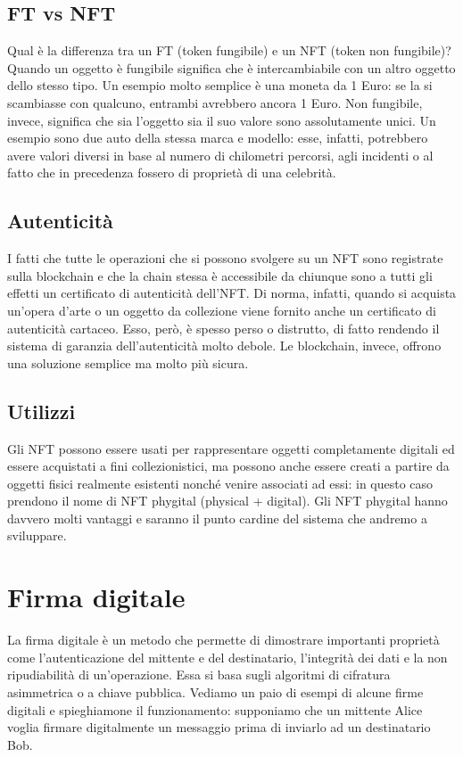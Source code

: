 \documentclass[12pt]{report}
\begin{document}
\subsection{FT vs NFT}
Qual è la differenza tra un FT (token fungibile) e un NFT (token non fungibile)?\newline
Quando un oggetto è fungibile significa che è intercambiabile con un altro oggetto dello stesso tipo. Un esempio molto semplice è una moneta da 1 Euro: se la si scambiasse con qualcuno, entrambi avrebbero ancora 1 Euro.\newline
Non fungibile, invece, significa che sia l'oggetto sia il suo valore sono assolutamente unici. Un esempio sono due auto della stessa marca e modello: esse, infatti, potrebbero avere valori diversi in base al numero di chilometri percorsi, agli incidenti o al fatto che in precedenza fossero di proprietà di una celebrità. \cite{Sei}
\subsection{Autenticità}
I fatti che tutte le operazioni che si possono svolgere su un NFT sono registrate sulla blockchain e che la chain stessa è accessibile da chiunque sono a tutti gli effetti un certificato di autenticità dell'NFT.\newline
Di norma, infatti, quando si acquista un'opera d'arte o un oggetto da collezione viene fornito anche un certificato di autenticità cartaceo. Esso, però, è spesso perso o distrutto, di fatto rendendo il sistema di garanzia dell'autenticità molto debole.\newline
Le blockchain, invece, offrono una soluzione semplice ma molto più sicura. \cite{Sei}
\subsection{Utilizzi}
Gli NFT possono essere usati per rappresentare oggetti completamente digitali ed essere acquistati a fini collezionistici, ma possono anche essere creati a partire da oggetti fisici realmente esistenti nonché venire associati ad essi: in questo caso prendono il nome di NFT phygital (physical + digital).\newline
Gli NFT phygital hanno davvero molti vantaggi e saranno il punto cardine del sistema che andremo a sviluppare. \cite{Sei} \newpage

\section{Firma digitale}
\label{sec:digitalsignature}
La firma digitale è un metodo che permette di dimostrare importanti proprietà come l’autenticazione del mittente e del destinatario, l’integrità dei dati e la non ripudiabilità di un'operazione. Essa si basa sugli algoritmi di cifratura asimmetrica o a chiave pubblica.\newline
Vediamo un paio di esempi di alcune firme digitali e spieghiamone il funzionamento: supponiamo che un mittente Alice voglia firmare digitalmente un messaggio prima di inviarlo ad un destinatario Bob.
\end{document}
